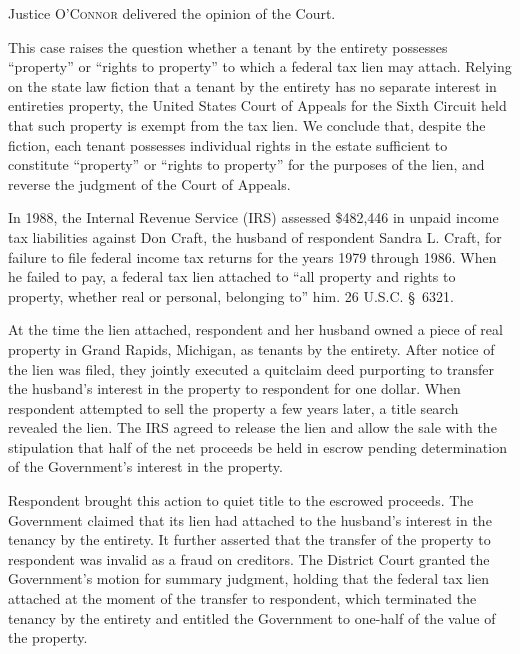 

\opinion Justice \textsc{O'Connor} delivered the opinion of the Court.

This case raises the question whether a tenant by the entirety possesses
``property'' or ``rights to property'' to which a federal tax lien may attach.
Relying on the state law fiction that a tenant by the entirety has no separate
interest in entireties property, the United States Court of Appeals for the
Sixth Circuit held that such property is exempt from the tax lien. We conclude
that, despite the fiction, each tenant possesses individual rights in the
estate sufficient to constitute ``property'' or ``rights to property'' for the
purposes of the lien, and reverse the judgment of the Court of Appeals.


In 1988, the Internal Revenue Service (IRS) assessed \$482,446 in unpaid income
tax liabilities against Don Craft, the husband of respondent Sandra L. Craft,
for failure to file federal income tax returns for the years 1979 through 1986.
When he failed to pay, a federal tax lien attached to ``all property and rights
to property, whether real or personal, belonging to'' him. 26 U.S.C. \S~6321.

At the time the lien attached, respondent and her husband owned a piece of real
property in Grand Rapids, Michigan, as tenants by the entirety. After notice of
the lien was filed, they jointly executed a quitclaim deed purporting to
transfer the husband's interest in the property to respondent for one dollar.
When respondent attempted to sell the property a few years later, a title
search revealed the lien. The IRS agreed to release the lien and allow the sale
with the stipulation that half of the net proceeds be held in escrow pending
determination of the Government's interest in the property.

Respondent brought this action to quiet title to the escrowed proceeds. The
Government claimed that its lien had attached to the husband's interest in the
tenancy by the entirety. It further asserted that the transfer of the property
to respondent was invalid as a fraud on creditors. The District Court granted
the Government's motion for summary judgment, holding that the federal tax lien
attached at the moment of the transfer to respondent, which terminated the
tenancy by the entirety and entitled the Government to one-half of the value of
the property.

